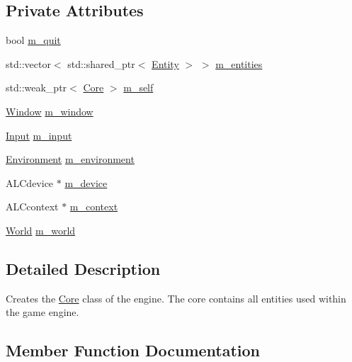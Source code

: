 \subsection*{Private Attributes}
\begin{DoxyCompactItemize}
\item 
bool \mbox{\hyperlink{class_disc___engine_1_1_core_a46ab3f77188852373af31ee9a8ce0e35}{m\+\_\+quit}}
\item 
std\+::vector$<$ std\+::shared\+\_\+ptr$<$ \mbox{\hyperlink{class_disc___engine_1_1_entity}{Entity}} $>$ $>$ \mbox{\hyperlink{class_disc___engine_1_1_core_a9c96d37e599c0c720eff0902d1167b4d}{m\+\_\+entities}}
\item 
std\+::weak\+\_\+ptr$<$ \mbox{\hyperlink{class_disc___engine_1_1_core}{Core}} $>$ \mbox{\hyperlink{class_disc___engine_1_1_core_ad1ab0b3e42d2acb31e692580349b77cc}{m\+\_\+self}}
\item 
\mbox{\hyperlink{class_disc___engine_1_1_window}{Window}} \mbox{\hyperlink{class_disc___engine_1_1_core_a58ce3620378077daf23ff02b4aa359ee}{m\+\_\+window}}
\item 
\mbox{\hyperlink{class_disc___engine_1_1_input}{Input}} \mbox{\hyperlink{class_disc___engine_1_1_core_abadbc27626072251b7f735aae50aab93}{m\+\_\+input}}
\item 
\mbox{\hyperlink{class_disc___engine_1_1_environment}{Environment}} \mbox{\hyperlink{class_disc___engine_1_1_core_a12f5ab154ab249a8a1f43c0946c27ed2}{m\+\_\+environment}}
\item 
A\+L\+Cdevice $\ast$ \mbox{\hyperlink{class_disc___engine_1_1_core_a249f79c16df1b9774e962eb4c3f82736}{m\+\_\+device}}
\item 
A\+L\+Ccontext $\ast$ \mbox{\hyperlink{class_disc___engine_1_1_core_aa4c676736bedf5986cfd42da78d301bc}{m\+\_\+context}}
\item 
\mbox{\hyperlink{class_world}{World}} \mbox{\hyperlink{class_disc___engine_1_1_core_a1674fa028162d9ff66fdab471bc97590}{m\+\_\+world}}
\end{DoxyCompactItemize}


\subsection{Detailed Description}
Creates the \mbox{\hyperlink{class_disc___engine_1_1_core}{Core}} class of the engine. The core contains all entities used within the game engine. 

\subsection{Member Function Documentation}
\mbox{\label{class_disc___engine_1_1_core_a6cd7b26cd56b4a42da9ae8826de0df17}} 
